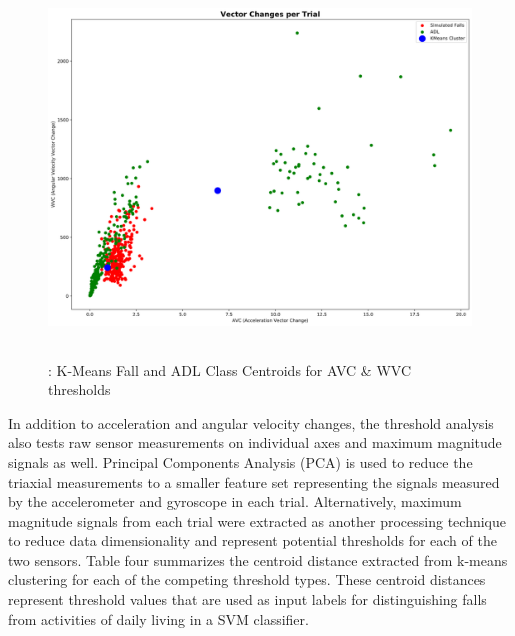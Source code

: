 \documentclass{llncs}
\begin{document}
\begin{figure}
	\centering
	\includegraphics[width=12cm, height=10cm]{images/VC_2clusters.png} 
	\caption{: K-Means Fall and ADL Class Centroids for AVC \& WVC thresholds}
	\label{Figure 1: 2 Clusters}
\end{figure}

	In addition to acceleration and angular velocity changes, the threshold analysis also tests raw sensor measurements on individual axes and maximum magnitude signals as well. Principal Components Analysis (PCA) is used to reduce the triaxial measurements to a smaller feature set representing the signals measured by the accelerometer and gyroscope in each trial. Alternatively, maximum magnitude signals from each trial were extracted as another processing technique to reduce data dimensionality and represent potential thresholds for each of the two sensors. Table four summarizes the centroid distance extracted from k-means clustering for each of the competing threshold types. These centroid distances represent threshold values that are used as input labels for distinguishing falls from activities of daily living in a SVM classifier. 
	
\end{document}
